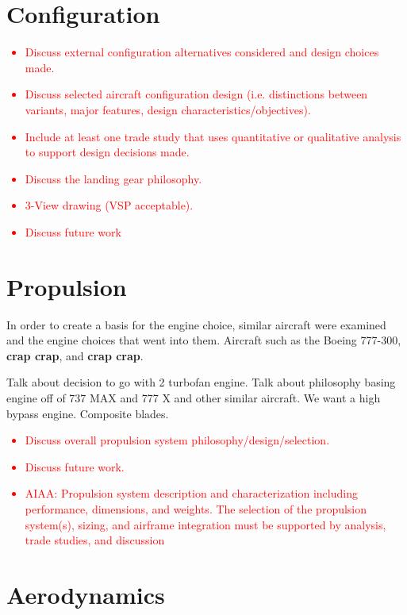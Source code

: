 \documentclass[conf]{new-aiaa}
\begin{document}
\section{Configuration}
\textcolor{red}{
\begin{itemize}
    \item Discuss external configuration alternatives considered and design choices made.
    \item Discuss selected aircraft configuration design (i.e. distinctions between variants, major features, design characteristics/objectives).
    \item Include at least one trade study that uses quantitative or qualitative analysis to support design decisions made.
    \item Discuss the landing gear philosophy.
    \item 3-View drawing (VSP acceptable).
    \item Discuss future work
\end{itemize}}

\section{Propulsion}

In order to create a basis for the engine choice, similar aircraft were examined and the engine choices that went into them. Aircraft such as the Boeing 777-300, \textbf{crap crap}, and \textbf{crap crap}.  

Talk about decision to go with 2 turbofan engine. Talk about philosophy basing engine off of 737 MAX and 777 X and other similar aircraft. We want a high bypass engine. Composite blades. 

\textcolor{red}{
\begin{itemize}
    \item Discuss overall propulsion system philosophy/design/selection.
    \item Discuss future work.
    \item AIAA: Propulsion system description and characterization including performance,
    dimensions, and weights. The selection of the propulsion system(s), sizing, and
    airframe integration must be supported by analysis, trade studies, and discussion
\end{itemize}}

\section{Aerodynamics}
\end{document}
